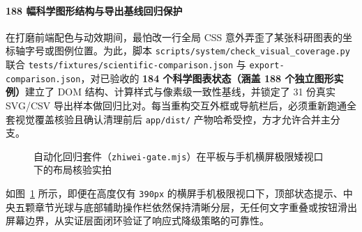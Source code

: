 \paragraph{188 幅科学图形结构与导出基线回归保护}在打磨前端配色与动效期间，最怕改一行全局 CSS 意外弄歪了某张科研图表的坐标轴字号或图例位置。为此，脚本 \texttt{scripts/system/check\_visual\_coverage.py} 联合 \texttt{tests/fixtures/scientific-comparison.json} 与 \texttt{export-comparison.json}，对已验收的 \textbf{184 个科学图表状态（涵盖 188 个独立图形实例）}建立了 DOM 结构、计算样式与像素级一致性基线，并锁定了 31 份真实 SVG/CSV 导出样本做回归比对。每当重构交互外框或导航栏后，必须重新跑通全套视觉覆盖核验且确认清理前后 \texttt{app/dist/} 产物哈希受控，方才允许合并主分支。


\begin{figure}[!htbp]
\centering
{}\hfill
{}
\caption{自动化回归套件（\texttt{zhiwei-gate.mjs}）在平板与手机横屏极限矮视口下的布局核验实拍}
\label{fig:qa-viewports-pair}
\end{figure}

如图~\ref{fig:qa-viewports-pair} 所示，即便在高度仅有 \texttt{390px} 的横屏手机极限视口下，顶部状态提示、中央五颗章节光球与底部辅助操作栏依然保持清晰分层，无任何文字重叠或按钮滑出屏幕边界，从实证层面闭环验证了响应式降级策略的可靠性。
